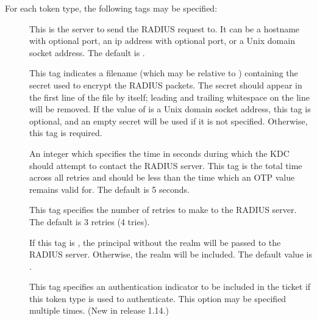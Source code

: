 \documentclass[letterpaper,10pt,english]{sphinxmanual}
\begin{document}
\sphinxAtStartPar
For each token type, the following tags may be specified:
\begin{description}
\item[{}] \leavevmode
\sphinxAtStartPar
This is the server to send the RADIUS request to.  It can be a
hostname with optional port, an ip address with optional port, or
a Unix domain socket address.  The default is
{\hyperref[\detokenize{mitK5defaults:paths}]{}}.

\item[{}] \leavevmode
\sphinxAtStartPar
This tag indicates a filename (which may be relative to {\hyperref[\detokenize{mitK5defaults:paths}]{}})
containing the secret used to encrypt the RADIUS packets.  The
secret should appear in the first line of the file by itself;
leading and trailing whitespace on the line will be removed.  If
the value of  is a Unix domain socket address, this tag
is optional, and an empty secret will be used if it is not
specified.  Otherwise, this tag is required.

\item[{}] \leavevmode
\sphinxAtStartPar
An integer which specifies the time in seconds during which the
KDC should attempt to contact the RADIUS server.  This tag is the
total time across all retries and should be less than the time
which an OTP value remains valid for.  The default is 5 seconds.

\item[{}] \leavevmode
\sphinxAtStartPar
This tag specifies the number of retries to make to the RADIUS
server.  The default is 3 retries (4 tries).

\item[{}] \leavevmode
\sphinxAtStartPar
If this tag is , the principal without the realm will be
passed to the RADIUS server.  Otherwise, the realm will be
included.  The default value is .

\item[{}] \leavevmode
\sphinxAtStartPar
This tag specifies an authentication indicator to be included in
the ticket if this token type is used to authenticate.  This
option may be specified multiple times.  (New in release 1.14.)

\end{description}
\end{document}
